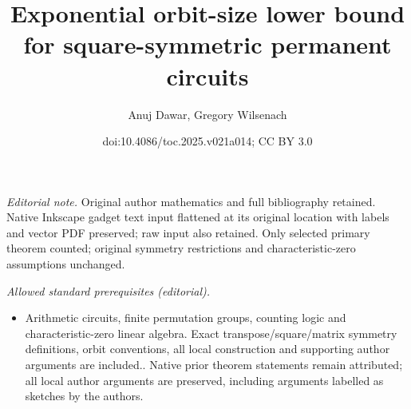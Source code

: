 \documentclass[11pt]{article}
\title{Exponential orbit-size lower bound for square-symmetric permanent circuits}
\author{Anuj Dawar, Gregory Wilsenach}
\date{doi:10.4086/toc.2025.v021a014; CC BY 3.0}
\begin{document}
\maketitle
\noindent\textit{Editorial note.} Original author mathematics and full bibliography retained. Native Inkscape gadget text input flattened at its original location with labels and vector PDF preserved; raw input also retained. Only selected primary theorem counted; original symmetry restrictions and characteristic-zero assumptions unchanged.\par\medskip
\noindent\textit{Allowed standard prerequisites (editorial).}\begin{itemize}
\item Arithmetic circuits, finite permutation groups, counting logic and characteristic-zero linear algebra. Exact transpose/square/matrix symmetry definitions, orbit conventions, all local construction and supporting author arguments are included.. Native prior theorem statements remain attributed; all local author arguments are preserved, including arguments labelled as sketches by the authors.
\end{itemize}\medskip
\end{document}
